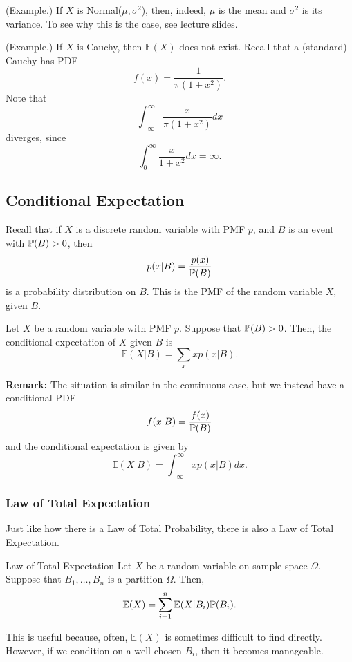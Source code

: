 \begin{mdframed}[]
    (Example.) If $X$ is Normal($\mu, \sigma^2$), then, indeed, $\mu$ is the mean and $\sigma^2$ is its variance. To see why this is the case, see lecture slides.
\end{mdframed}

\begin{mdframed}[]
    (Example.) If $X$ is Cauchy, then $\mathbb{E}(X)$ does not exist. Recall that a (standard) Cauchy has PDF 
    \[f(x) = \frac{1}{\pi(1 + x^2)}.\]
    Note that 
    \[\int_{-\infty}^{\infty} \frac{x}{\pi (1 + x^2)}dx\]
    diverges, since
    \[\int_{0}^{\infty} \frac{x}{1 + x^2}dx = \infty.\]
\end{mdframed}

\subsection{Conditional Expectation}
Recall that if $X$ is a discrete random variable with PMF $p$, and $B$ is an event with $\mathbb{P}(B) > 0$, then 
\[p(x | B) = \frac{p(x)}{\mathbb{P}(B)}\]
is a probability distribution on $B$. This is the PMF of the random variable $X$, given $B$. 

\begin{definition}{}{}
    Let $X$ be a random variable with PMF $p$. Suppose that $\mathbb{P}(B) > 0$. Then, the conditional expectation of $X$ given $B$ is 
    \[\mathbb{E}(X | B) = \sum_{x} xp(x | B).\]    
\end{definition}
\textbf{Remark:} The situation is similar in the continuous case, but we instead have a conditional PDF 
\[f(x | B) = \frac{f(x)}{\mathbb{P}(B)}\]
and the conditional expectation is given by  
\[\mathbb{E}(X | B) = \int_{-\infty}^{\infty} xp(x | B) dx.\]  


\subsubsection{Law of Total Expectation}
Just like how there is a Law of Total Probability, there is also a Law of Total Expectation. 
\begin{theorem}{Law of Total Expectation}{}
    Let $X$ be a random variable on sample space $\Omega$. Suppose that $B_1, \dots, B_n$ is a partition $\Omega$. Then, 
    \[\mathbb{E}(X) = \sum_{i = 1}^{n} \mathbb{E}(X | B_i) \mathbb{P}(B_i).\]
\end{theorem}
This is useful because, often, $\mathbb{E}(X)$ is sometimes difficult to find directly. However, if we condition on a well-chosen $B_i$, then it becomes manageable. 

